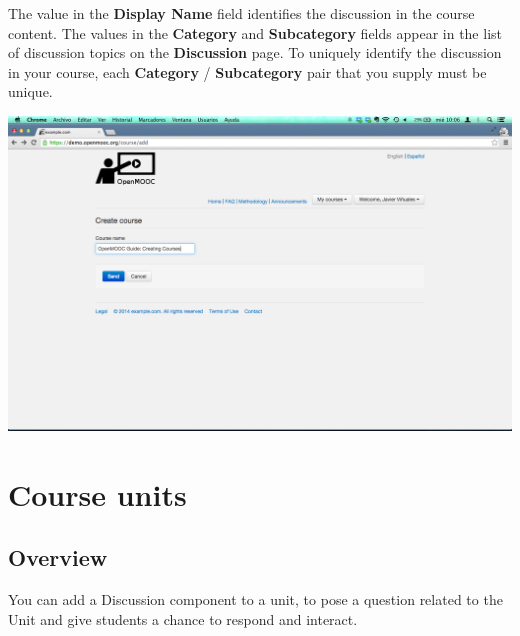 \documentclass[letterpaper,10pt,english]{sphinxmanual}
\begin{document}
\begin{enumerate}
The value in the \textbf{Display Name} field identifies the discussion in the
course content. The values in the \textbf{Category} and \textbf{Subcategory} fields
appear in the list of discussion topics on the \textbf{Discussion} page. To
uniquely identify the discussion in your course, each \textbf{Category} /
\textbf{Subcategory} pair that you supply must be unique.

\includegraphics{3_create_course-3.png}

\end{enumerate}


\chapter{Course units}
\label{course_units:course-units}\label{course_units::doc}\label{course_units:id1}

\section{Overview}
\label{course_units:overview}
You can add a Discussion component to a unit, to pose a question related to the
Unit and give students a chance to respond and interact.
\end{document}

